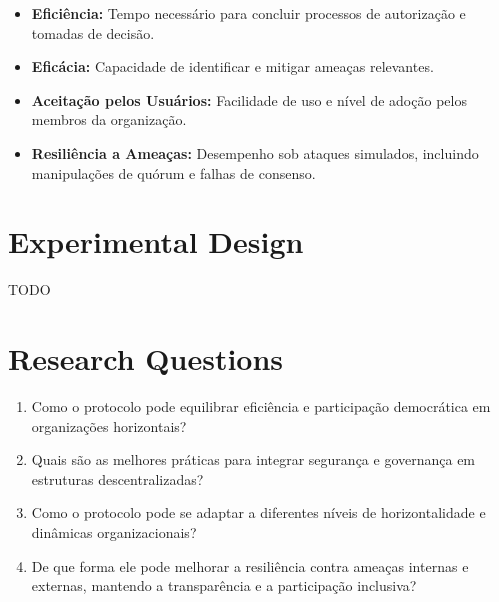 \begin{itemize}
    \item \textbf{Eficiência:} Tempo necessário para concluir
processos de autorização e tomadas de decisão.
    \item \textbf{Eficácia:} Capacidade de identificar e mitigar
ameaças relevantes.
    \item \textbf{Aceitação pelos Usuários:} Facilidade de uso e nível
de adoção pelos membros da organização.
    \item \textbf{Resiliência a Ameaças:} Desempenho sob ataques
simulados, incluindo manipulações de quórum e falhas de consenso.
\end{itemize}

\section{Experimental Design}
\label{sec:experimental_design}

TODO

\section{Research Questions}
\label{sec:research_questions}

\begin{enumerate}
    \item Como o protocolo pode equilibrar eficiência e participação
democrática em organizações horizontais?
    \item Quais são as melhores práticas para integrar segurança e
governança em estruturas descentralizadas?
    \item Como o protocolo pode se adaptar a diferentes níveis de
horizontalidade e dinâmicas organizacionais?
    \item De que forma ele pode melhorar a resiliência contra ameaças
internas e externas, mantendo a transparência e a participação
inclusiva?
\end{enumerate}

